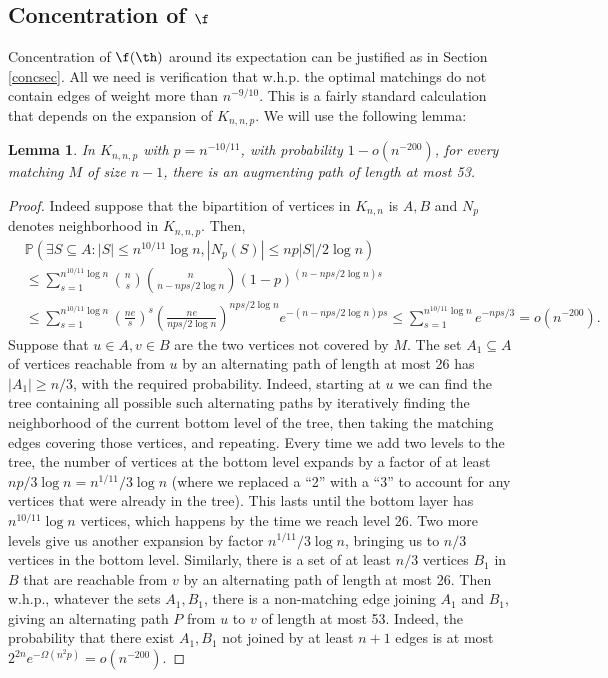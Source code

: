 \documentclass[12pt]{article}
\newcommand{\1}{\textbf{1}}
\newtheorem{lemma}[theorem]{Lemma}
\newcommand{\brac}[1]{\left(#1\right)}
\def\Pr{\mathbb{P}}
\begin{document}
\subsection{Concentration of $\f$}
Concentration of $\f(\th)$ around its expectation can be justified as in Section \ref{concsec}. All we need is verification that w.h.p.  the optimal matchings do not contain edges of weight more than $n^{-9/10}$. This is a fairly standard calculation that depends on the expansion of $K_{n,n,p}$. We will use the following lemma:
\begin{lemma}\label{Mn-1}
In $K_{n,n,p}$ with $p=n^{-10/11}$, with probability $1-o(n^{-200})$, for every matching $M$ of size $n-1$, there is an augmenting path of length at most 53.
\end{lemma}
\begin{proof}
Indeed suppose that the bipartition of vertices in $K_{n,n}$ is $A,B$ and $N_p$ denotes neighborhood in $K_{n,n,p}$. Then, 
\begin{align*}
&\Pr(\exists S\subseteq A:|S|\leq n^{10/11} \log n,|N_p(S)|\le np|S|/2\log n)\\
&\leq \sum_{s=1}^{n^{10/11}\log n}\binom{n}{s}\binom{n}{n-nps/2\log n}(1-p)^{(n-nps/2\log n)s}\\
& \leq \sum_{s=1}^{n^{10/11}\log n}\brac{\frac{ne}{s}}^s \brac{\frac{ne}{nps/2\log n}}^{nps/2\log n} e^{-(n-nps/2\log n)ps}
 \leq \sum_{s=1}^{n^{10/11}\log n}  e^{-nps/3}=o(n^{-200}).
\end{align*}
Suppose that $u\in A,v\in B$ are the two vertices not covered by $M$. The set $A_1 \subseteq A$ of vertices reachable from $u$ by an alternating path of length at most 26 has $|A_1| \ge n/3$, with the required probability. Indeed, starting at $u$ we can find the tree containing all possible such alternating paths by iteratively finding the neighborhood of the current bottom level of the tree, then taking the matching edges covering those vertices, and repeating. Every time we add two levels to the tree, the number of vertices at the bottom level expands by a factor of at least $np/3 \log n = n^{1/11}/3 \log n$ (where we replaced a ``2'' with a ``3'' to account for any vertices that were already in the tree). This lasts until the bottom layer has $n^{10/11} \log n$ vertices, which happens by the time we reach level 26. Two more levels give us another expansion by factor $n^{1/11}/3 \log n$, bringing us to $n/3$ vertices in the bottom level. Similarly, there is a set of at least $n/3$ vertices $B_1$ in $B$ that are reachable from $v$ by an alternating path of length at most 26. Then w.h.p., whatever the sets $A_1,B_1$,  there is a non-matching edge  joining $A_1$ and $B_1$, giving an alternating path $P$ from $u$ to $v$ of length at most 53. Indeed, the probability that there exist $A_1,B_1$ not joined by at least $n+1$ edges is at most $2^{2n}e^{-\Omega(n^2p)}=o(n^{-200})$.
\end{proof}
\end{document}
